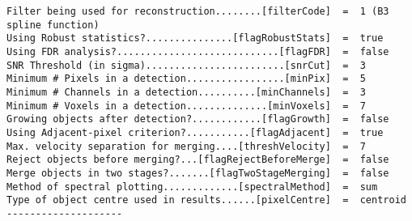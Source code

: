 {\begin{verbatim}
Filter being used for reconstruction........[filterCode]  =  1 (B3 spline function)
Using Robust statistics?...............[flagRobustStats]  =  true
Using FDR analysis?............................[flagFDR]  =  false
SNR Threshold (in sigma)........................[snrCut]  =  3
Minimum # Pixels in a detection.................[minPix]  =  5
Minimum # Channels in a detection..........[minChannels]  =  3
Minimum # Voxels in a detection..............[minVoxels]  =  7
Growing objects after detection?............[flagGrowth]  =  false
Using Adjacent-pixel criterion?...........[flagAdjacent]  =  true
Max. velocity separation for merging....[threshVelocity]  =  7
Reject objects before merging?...[flagRejectBeforeMerge]  =  false
Merge objects in two stages?.......[flagTwoStageMerging]  =  false
Method of spectral plotting.............[spectralMethod]  =  sum
Type of object centre used in results......[pixelCentre]  =  centroid
--------------------
\end{verbatim}
}
